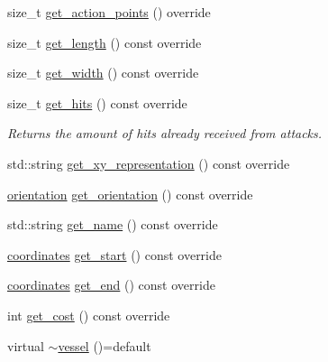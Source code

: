 \begin{DoxyCompactItemize}
size\+\_\+t \hyperlink{classbattle__ship_1_1vessel_a398b4134137d9e11c13e6aee548e1802}{get\+\_\+action\+\_\+points} () override
\item 
size\+\_\+t \hyperlink{classbattle__ship_1_1vessel_ae166b521339b6a7b8c0be1a9d7861131}{get\+\_\+length} () const override
\item 
size\+\_\+t \hyperlink{classbattle__ship_1_1vessel_a84716baaafee9839292f67b03abc7272}{get\+\_\+width} () const override
\item 
size\+\_\+t \hyperlink{classbattle__ship_1_1vessel_a549dc0f3fc45f3b3f7fa247316900a9a}{get\+\_\+hits} () const override
\begin{DoxyCompactList}\small\item\em Returns the amount of hits already received from attacks. \end{DoxyCompactList}\item 
std\+::string \hyperlink{classbattle__ship_1_1vessel_a84bfaba9be4f15f6ec934c925d11967d}{get\+\_\+xy\+\_\+representation} () const override
\item 
\hyperlink{namespacebattle__ship_aed87488f0a73f0d0679fe343fb61c784}{orientation} \hyperlink{classbattle__ship_1_1vessel_a698c7811878e56b7ba7eb6d88e6ac13f}{get\+\_\+orientation} () const override
\item 
std\+::string \hyperlink{classbattle__ship_1_1vessel_a623a1b35355db117b5381a3a0f5774eb}{get\+\_\+name} () const override
\item 
\hyperlink{structbattle__ship_1_1coordinates}{coordinates} \hyperlink{classbattle__ship_1_1vessel_aba133e1debe50caa9cbbae5e867b5995}{get\+\_\+start} () const override
\item 
\hyperlink{structbattle__ship_1_1coordinates}{coordinates} \hyperlink{classbattle__ship_1_1vessel_ab24ee1fe21632b510833c8369ef3560a}{get\+\_\+end} () const override
\item 
int \hyperlink{classbattle__ship_1_1vessel_aadca1fe2ac265ed9f22e68490b6b22eb}{get\+\_\+cost} () const override
\item 
virtual \hyperlink{classbattle__ship_1_1vessel_a9e2c9554b6ce2af6f4e6168d1cf6591b}{$\sim$vessel} ()=default
\end{DoxyCompactItemize}
